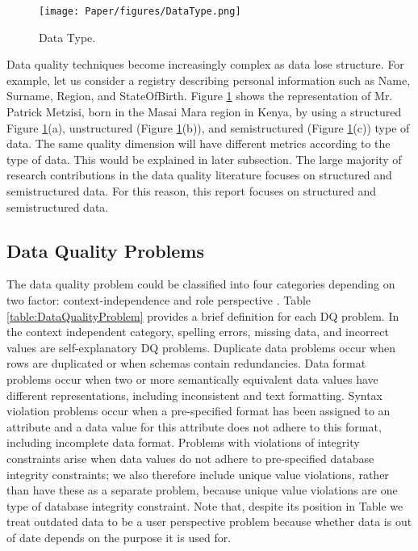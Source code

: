 \documentclass[pdftex,english,oribibl]{llncs}
\begin{document}
  \begin{figure}
    \centering
    \texttt{[image: Paper/figures/DataType.png]}
    \caption{Data Type.}
    \label{fig:datatype}
  \end{figure}

 Data quality techniques become increasingly complex as data lose structure. For example, let us consider a registry describing personal information such as Name, Surname, Region, and StateOfBirth. Figure \ref{fig:datatype} shows the representation of Mr. Patrick Metzisi, born in the Masai Mara region in Kenya, by using a structured Figure \ref{fig:datatype}(a), unstructured (Figure \ref{fig:datatype}(b)), and semistructured (Figure \ref{fig:datatype}(c)) type of data.
 The same quality dimension will have different metrics according to the type of data. This would be explained in later subsection.
 The large majority of research contributions in the data quality literature focuses on structured and semistructured data. For this reason, this report focuses on structured and semistructured data.

\subsection{Data Quality Problems}\label{sec:DataQualityProblems}
The data quality problem could be classified into four categories depending on two factor: context-independence and role perspective \cite{Borek2011AClassficationOfDataQualityAssessmentMethod}.
 Table \ref{table:DataQualityProblem} provides a brief definition for each DQ problem.
 In the context independent category, spelling errors, missing data, and incorrect values are self-explanatory DQ problems.
 Duplicate data problems occur when rows are duplicated or when schemas contain redundancies.
 Data format problems occur when two or more semantically equivalent data values have different representations, including inconsistent and text formatting.
 Syntax violation problems occur when a pre-specified format has been assigned to an attribute and a data value for this attribute does not adhere to this format, including incomplete data format.
 Problems with violations of integrity constraints arise when data values do not adhere to pre-specified database integrity constraints; we also therefore include unique value violations, rather than have these as a separate problem, because unique value violations are one type of database integrity constraint.
 Note that, despite its position in Table we treat outdated data to be a user perspective problem because whether data is out of date depends on the purpose it is used for.
\end{document}
